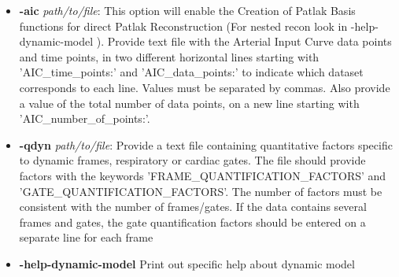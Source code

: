 \documentclass[a4paper, 11pt]{article}
\begin{document}
\begin{itemize}
\item \textbf{-aic} \textit{path/to/file}: This option will enable the Creation of Patlak Basis functions for direct Patlak Reconstruction (For nested recon look in -help-dynamic-model ). Provide text file with the Arterial Input Curve data points and time points, in two different horizontal lines starting with 'AIC\_time\_points:' and 'AIC\_data\_points:' to indicate which dataset corresponds to each line. Values must be separated by commas. Also provide a value of the total number of data points, on a new line starting with 'AIC\_number\_of\_points:'.
\item \textbf{-qdyn} \textit{path/to/file}: Provide a text file containing quantitative factors specific to dynamic frames, respiratory or cardiac gates. The file should provide factors with the keywords 'FRAME\_QUANTIFICATION\_FACTORS' and 'GATE\_QUANTIFICATION\_FACTORS'. The number of factors must be consistent with the number of frames/gates. If the data contains several frames and gates, the gate quantification factors should be entered on a separate line for each frame 
\item \textbf{-help-dynamic-model} \: Print out specific help about dynamic model
\end{itemize}



 
% 


\end{document}
